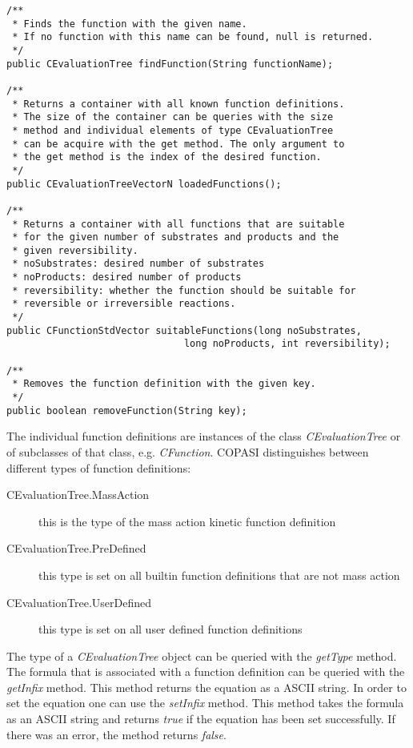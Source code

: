 \documentclass[a4,10pt]{article}
\begin{document}
\begin{lstlisting}
/**
 * Finds the function with the given name.
 * If no function with this name can be found, null is returned.
 */
public CEvaluationTree findFunction(String functionName);

/**
 * Returns a container with all known function definitions.
 * The size of the container can be queries with the size 
 * method and individual elements of type CEvaluationTree 
 * can be acquire with the get method. The only argument to
 * the get method is the index of the desired function.
 */  
public CEvaluationTreeVectorN loadedFunctions();

/**
 * Returns a container with all functions that are suitable
 * for the given number of substrates and products and the 
 * given reversibility.
 * noSubstrates: desired number of substrates
 * noProducts: desired number of products
 * reversibility: whether the function should be suitable for
 * reversible or irreversible reactions.
 */  
public CFunctionStdVector suitableFunctions(long noSubstrates, 
                               long noProducts, int reversibility);

/**
 * Removes the function definition with the given key.
 */
public boolean removeFunction(String key);
\end{lstlisting}

The individual function definitions are instances of the class \textit{CEvaluationTree} or of subclasses of that class, e.g. \textit{CFunction}.
COPASI distinguishes between different types of function definitions:

\begin{description}
\item[CEvaluationTree.MassAction]{this is the type of the mass action kinetic function definition}
\item[CEvaluationTree.PreDefined]{this type is set on all builtin function definitions that are not mass action}
\item[CEvaluationTree.UserDefined]{this type is set on all user defined function definitions}
\end{description}

The type of a \textit{CEvaluationTree} object can be queried with the \textit{getType} method. 
The formula that is associated with a function definition can be queried with the \textit{getInfix} method. This method returns the equation as a ASCII string. In order to set the equation one can use the \textit{setInfix} method. This method takes the formula as an ASCII string and returns \textit{true} if the equation has been set successfully. If there was an error, the method returns \textit{false}. 
\end{document}
